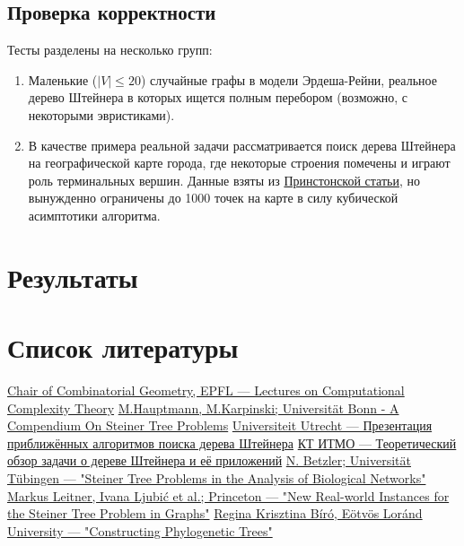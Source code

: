 \documentclass[11pt,a4paper]{report}
\def\le{\leqslant}
\theoremstyle{definition}
\theoremstyle{definition}
\theoremstyle{definition}
\begin{document}
	\subsection{Проверка корректности}
		Тесты разделены на несколько групп:
		\begin{enumerate}
			\item Маленькие ($|V| \le 20$) случайные графы в модели Эрдеша-Рейни, реальное дерево Штейнера в которых ищется полным перебором (возможно, с некоторыми эвристиками).
			\item В качестве примера реальной задачи рассматривается поиск дерева Штейнера на географической карте города, где некоторые строения помечены и играют роль терминальных вершин. Данные взяты из \href{https://homepage.univie.ac.at/ivana.ljubic/research/STP/}{Принстонской статьи}, но вынужденно ограничены до 1000 точек на карте в силу кубической асимптотики алгоритма.
		\end{enumerate}
	\section{Результаты}
	\section{Список литературы}
	\renewcommand\bibname{}
	\patchcmd{\thebibliography}{\chapter*}{\section*}{}{}
	\vspace*{-1cm}
	\begin{thebibliography}{}
		 \href{https://dcg.epfl.ch/wp-content/uploads/2018/10/9-NPHardness.pdf}{Chair of Combinatorial Geometry, EPFL — Lectures on Computational Complexity Theory}
		 \href{http://theory.cs.uni-bonn.de/info5/steinerkompendium/netcompendium.pdf}{M.Hauptmann, M.Karpinski; Universität Bonn - A Compendium On Steiner Tree Problems}
		 \href{http://www.cs.uu.nl/docs/vakken/an/teoud/an-steiner.ppt}{Universiteit Utrecht — Презентация приближённых алгоритмов поиска дерева Штейнера}
		\href{http://rain.ifmo.ru/cat/data/theory/unsorted/steiner-problem-2010/article.pdf}{КТ ИТМО — Теоретический обзор задачи о дереве Штейнера и её приложений}
		 \href{https://fpt.akt.tu-berlin.de/publications/steiner-tree-betzler06.pdf}{N. Betzler; Universität Tübingen — "Steiner Tree Problems in the Analysis of Biological Networks"}
		 \href{https://homepage.univie.ac.at/ivana.ljubic/research/STP/realworld-stp-report-short.pdf}{Markus Leitner, Ivana Ljubić et al.; Princeton — "New Real-world Instances for the Steiner Tree Problem in Graphs"}
		 \href{http://web.cs.elte.hu/~berkri/Theses/Biro.pdf }{Regina Krisztina Bíró, Eötvös Loránd University — "Constructing Phylogenetic Trees"}
	\end{thebibliography}
\end{document}
